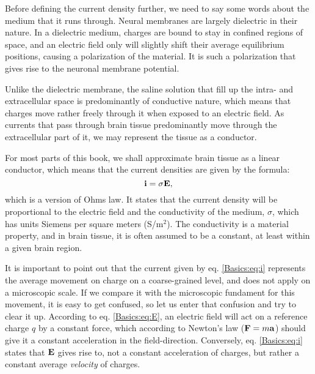 Before defining the current density further, we need to say some words about the medium that it runs through. Neural membranes are largely dielectric in their nature. In a dielectric medium, charges are bound to stay in confined regions of space, and an electric field only will slightly shift their average equilibrium positions, causing a polarization of the material. It is such a polarization that gives rise to the neuronal membrane potential. 

Unlike the dielectric membrane, the saline solution that fill up the intra- and extracellular space is predominantly of conductive nature, which means that charges move rather freely through it when exposed to an electric field. As currents that pass through brain tissue predominantly move through the extracellular part of it, we may represent the tissue as a conductor. 

For most parts of this book, we shall approximate brain tissue as a linear conductor, which means that the current densities are given by the formula:
\begin{equation}
{\bf i} = \sigma {\bf E}, 
\label{Basics:eq:i}
\end{equation}
which is a version of Ohms law. It states that the current density will be proportional to the electric field and the conductivity of the medium, $\sigma$, which has units Siemens per square meters (S/m$^2$). The conductivity is a material property, and in brain tissue, it is often assumed to be a constant, at least within a given brain region. 

It is important to point out that the current given by eq. \ref{Basics:eq:i} represents the average movement on charge on a coarse-grained level, and does not apply on a microscopic scale. If we compare it with the microscopic fundament for this movement, it is easy to get confused, so let us enter that confusion and try to clear it up. According to eq. \ref{Basics:eq:E}, an electric field will act on a reference charge $q$ by a constant force, which according to Newton's law (${\bf F} = m{\bf a}$) should give it a constant acceleration in the field-direction. Conversely, eq. \ref{Basics:eq:i} states that ${\bf E}$ gives rise to, not a constant acceleration of charges, but rather a constant average \textit{velocity} of charges. 

